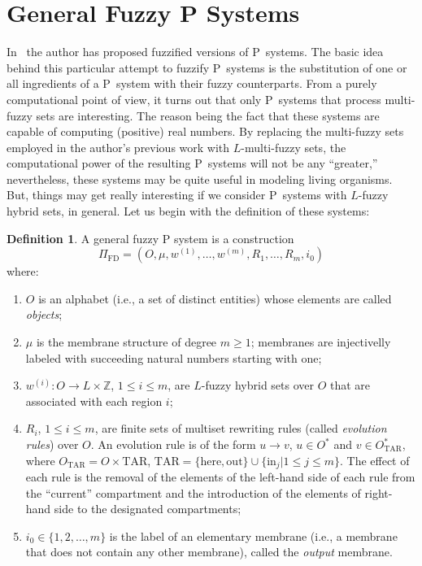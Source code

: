 \documentclass{amsart}
\theoremstyle{definition}
\newtheorem{definition}[theorem]{Definition}
\begin{document}
\section{General Fuzzy P Systems}
In~\cite{syropoulos06} the author has proposed fuzzified versions of P~systems.
The basic idea behind this particular attempt to fuzzify P~systems is the 
substitution of one or all ingredients of a P~system with their fuzzy 
counterparts. From a purely computational point of view, it turns out that only P~systems 
that process multi-fuzzy sets are interesting. The reason being the fact that these systems 
are capable of computing (positive) real numbers. By replacing the multi-fuzzy sets employed 
in the author's previous work with $L$-multi-fuzzy sets, the computational power of the resulting 
P~systems will not be any ``greater,''  nevertheless, these systems may be quite useful in modeling 
living organisms. But, things may get really interesting if we consider P~systems with
$L$-fuzzy hybrid sets, in general. Let us begin with the definition of these systems:
\begin{definition}\label{f:data}
A general fuzzy P system is a construction
\begin{displaymath}
\Pi_{\mathrm{FD}}=(O, \mu, w^{(1)},\ldots, w^{(m)},
     R_1,\ldots, R_m, i_0)
\end{displaymath}
where:
\begin{enumerate}
\item $O$ is an alphabet (i.e., a set of distinct entities) whose elements
      are called \textit{objects};
\item $\mu$ is the membrane structure of degree $m\ge 1$; membranes
      are injectivelly labeled with succeeding natural numbers starting with
      one;
\item $w^{(i)}:O\rightarrow L\times\mathbb{Z}$, $1\le i\le m$,
      are $L$-fuzzy hybrid sets over $O$ that are associated with each region $i$;
\item $R_i$, $1\le i\le m$, are finite sets of multiset rewriting rules
      (called
      \textit{evolution rules}) over $O$. An evolution rule is of the form
      $u\rightarrow v$, $u\in O^{\ast}$ and $v\in O^{\ast}_{\mathrm{TAR}}$,
      where $O_{\mathrm{TAR}} = O\times\mathrm{TAR}$,
      $\mathrm{TAR}=\{\mathrm{here},\mathrm{out}\}\cup\{\mathrm{in}_{j} |
      1\le j\le m\}$. The effect of each rule is the removal of the
      elements of the left-hand side of each rule from the
      ``current'' compartment and the introduction of the elements of
      right-hand side to the designated compartments;
\item $i_0\in\{1,2,\ldots,m\}$ is the label of an elementary membrane (i.e.,
      a membrane that does not contain any other membrane), called the
      \textit{output} membrane.
\end{enumerate}
\end{definition}
\end{document}
